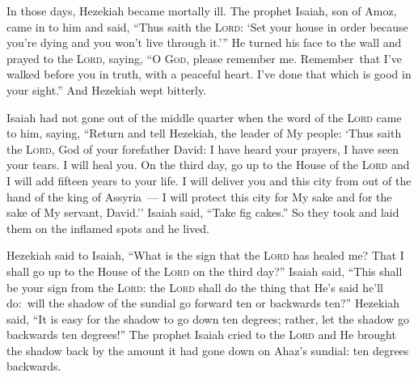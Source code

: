 
\begin{inparaenum}
   In those days, Hezekiah became mortally ill. The prophet Isaiah, son of Amoz, came in to him and said, ``Thus saith the \textsc{Lord}: `Set your house in order because you're dying and you won't live through it.'\thinspace''%
   He turned his face to the wall and prayed to the \textsc{Lord}, saying,%
   ``O \textsc{God}, please remember me. Remember\understood\ that I've walked before you in truth, with a peaceful heart. I've done that which is good in your sight.'' And Hezekiah wept bitterly.%
  
   Isaiah had not gone out of the middle quarter when the word of the \textsc{Lord} came to him, saying,%
   ``Return and tell Hezekiah, the leader of My people: `Thus saith the \textsc{Lord}, God of your forefather David: I have heard your prayers, I have seen your tears. I will heal you. On the third day, go up to the House of the \textsc{Lord}%
   and I will add fifteen years to your life. I will deliver you and this city from out of the hand of the king of Assyria~--- I will protect this city for My sake and for the sake of My servant, David.''%
   Isaiah said, ``Take fig cakes.'' So they took and laid them on the inflamed spots and he lived.%
  
   Hezekiah said to Isaiah, ``What is the sign that the \textsc{Lord} has healed me? That I shall go up to the House of the \textsc{Lord} on the third day?''%
   Isaiah said, ``This shall be your sign from the \textsc{Lord}: the \textsc{Lord} shall do the thing that He's said he'll do:\understood\ will the shadow of the sundial go forward ten or backwards ten?''%
   Hezekiah said, ``It is easy for the shadow to go down ten degrees; rather, let the shadow go backwards ten degrees!''%
   The prophet Isaiah cried to the \textsc{Lord} and He brought the shadow back by the amount it had gone down on Ahaz's sundial: ten degrees backwards.%
  

\end{inparaenum}
